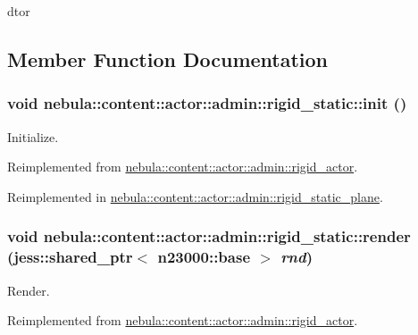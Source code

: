 dtor 

\subsection{Member Function Documentation}
\hypertarget{classnebula_1_1content_1_1actor_1_1admin_1_1rigid__static_a12aee11a228e35bd7a8b36ff411387a8}{
\subsubsection[{init}]{\setlength{\rightskip}{0pt plus 5cm}void nebula::content::actor::admin::rigid\_\-static::init ()}}
\label{classnebula_1_1content_1_1actor_1_1admin_1_1rigid__static_a12aee11a228e35bd7a8b36ff411387a8}


Initialize. 

Reimplemented from \hyperlink{classnebula_1_1content_1_1actor_1_1admin_1_1rigid__actor_a4de1558a31bb13bcf92279a4d823ddbb}{nebula::content::actor::admin::rigid\_\-actor}.

Reimplemented in \hyperlink{classnebula_1_1content_1_1actor_1_1admin_1_1rigid__static__plane_a5334403f326a185523ef2c7c380ffa8f}{nebula::content::actor::admin::rigid\_\-static\_\-plane}.\hypertarget{classnebula_1_1content_1_1actor_1_1admin_1_1rigid__static_a574621febd60cbfd2949c00430d7f5f3}{
\subsubsection[{render}]{\setlength{\rightskip}{0pt plus 5cm}void nebula::content::actor::admin::rigid\_\-static::render (jess::shared\_\-ptr$<$ {\bf n23000::base} $>$ {\em rnd})}}
\label{classnebula_1_1content_1_1actor_1_1admin_1_1rigid__static_a574621febd60cbfd2949c00430d7f5f3}


Render. 

Reimplemented from \hyperlink{classnebula_1_1content_1_1actor_1_1admin_1_1rigid__actor_a2d1920022481d1e32da69c777ce73541}{nebula::content::actor::admin::rigid\_\-actor}.

